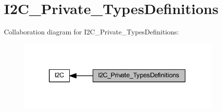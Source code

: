 \hypertarget{group___i2_c___private___types_definitions}{}\section{I2\+C\+\_\+\+Private\+\_\+\+Types\+Definitions}
\label{group___i2_c___private___types_definitions}
Collaboration diagram for I2\+C\+\_\+\+Private\+\_\+\+Types\+Definitions\+:
\nopagebreak
\begin{figure}[H]
\begin{center}
\leavevmode
\includegraphics[width=289pt]{group___i2_c___private___types_definitions}
\end{center}
\end{figure}
